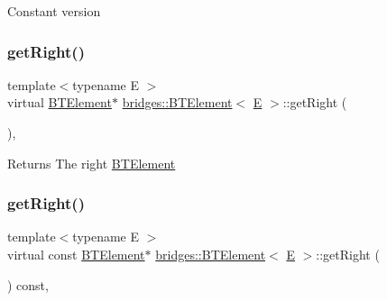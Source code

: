 Constant version \mbox{\label{classbridges_1_1_b_t_element_a931de8a71c04479a4aa0885ecee2a855}} 
\subsubsection{\texorpdfstring{getRight()}{getRight()}\hspace{0.1cm}{\footnotesize\ttfamily [1/2]}}
{\footnotesize\ttfamily template$<$typename E $>$ \\
virtual \mbox{\hyperlink{classbridges_1_1_b_t_element}{B\+T\+Element}}$\ast$ \mbox{\hyperlink{classbridges_1_1_b_t_element}{bridges\+::\+B\+T\+Element}}$<$ \mbox{\hyperlink{namespacebridges_acfb0a4f7877d8f63de3e6862004c50eda3a3ea00cfc35332cedf6e5e9a32e94da}{E}} $>$\+::get\+Right (\begin{DoxyParamCaption}{ }\end{DoxyParamCaption})\hspace{0.3cm}{\ttfamily [inline]}, {\ttfamily [virtual]}}

\begin{DoxyReturn}{Returns}
The right \mbox{\hyperlink{classbridges_1_1_b_t_element}{B\+T\+Element}} 
\end{DoxyReturn}
\mbox{\label{classbridges_1_1_b_t_element_ad3b12cd9fa6f3f18fb66c07dbc73a409}} 
\subsubsection{\texorpdfstring{getRight()}{getRight()}\hspace{0.1cm}{\footnotesize\ttfamily [2/2]}}
{\footnotesize\ttfamily template$<$typename E $>$ \\
virtual const \mbox{\hyperlink{classbridges_1_1_b_t_element}{B\+T\+Element}}$\ast$ \mbox{\hyperlink{classbridges_1_1_b_t_element}{bridges\+::\+B\+T\+Element}}$<$ \mbox{\hyperlink{namespacebridges_acfb0a4f7877d8f63de3e6862004c50eda3a3ea00cfc35332cedf6e5e9a32e94da}{E}} $>$\+::get\+Right (\begin{DoxyParamCaption}{ }\end{DoxyParamCaption}) const\hspace{0.3cm}{\ttfamily [inline]}, {\ttfamily [virtual]}}

